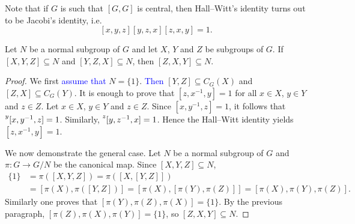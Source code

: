 Note that if $G$ is such that $[G,G]$ is central, then Hall--Witt's identity 
turns out to be Jacobi's identity, i.e. 
\[ [x,y,z][y,z,x][z,x,y]=1.\]  

%

\begin{lemma}
	\label{lemma:3subgrupos_general}
	Let $N$ be a normal subgroup of $G$ and let $X$, $Y$ and $Z$
	be subgroups of $G$. If $[X,Y,Z]\subseteq N$ and $[Y,Z,X]\subseteq N$, then 
	$[Z,X,Y]\subseteq N$.
\end{lemma}

\begin{proof}
	We first \textcolor{blue}{assume that} $N=\{1\}$. \textcolor{blue}{Then}
	$[Y,Z]\subseteq C_G(X)$ and $[Z,X]\subseteq C_G(Y)$. It
	is enough to prove that $[z,x^{-1},y]=1$ for all $x\in X$, $y\in Y$ and $z\in Z$. 
	Let $x\in X$, $y\in Y$ and $z\in Z$. Since $[x,y^{-1},z]=1$, it follows that 
	$\prescript{y}{}[x,y^{-1},z]=1$.
	Similarly, $\prescript{z}{}[y,z^{-1},x]=1$. Hence the 
	Hall--Witt identity yields 
	$[z,x^{-1},y]=1$.

	We now demonstrate the general case. Let $N$ be a normal subgroup of $G$ 
	and $\pi\colon G\to G/N$ be the canonical map. Since $[X,Y,Z]\subseteq N$, 
	\begin{align*}
		\{1\}&=\pi([X,Y,Z])=\pi([ X,[Y,Z]])\\
		&=[\pi(X),\pi([Y,Z])]=[ \pi(X),[\pi(Y),\pi(Z)]]=[\pi(X),\pi(Y),\pi(Z)]. 
	\end{align*}
	Similarly one proves that $[\pi(Y),\pi(Z),\pi(X)]=\{1\}$. By the previous paragraph,  
	$[\pi(Z),\pi(X),\pi(Y)]=\{1\}$, so $[Z,X,Y]\subseteq N$.
\end{proof}

